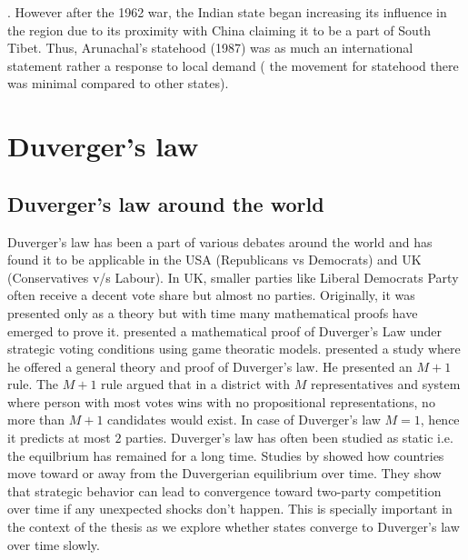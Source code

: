 \citep{verrier_elvin_2008}. However after the 1962 war, the Indian state began increasing its influence in the region due to its proximity with China claiming it to be a part of South Tibet. Thus, Arunachal’s statehood (1987) was as much an international statement rather a response to local demand ( the movement for statehood there was minimal compared to other states).

\section{Duverger's law}
\subsection{Duverger's law around the world}
Duverger's law has been a part of various debates around the world and has found it to be applicable in the USA (Republicans vs Democrats) and UK (Conservatives v/s Labour). In UK, smaller parties like Liberal Democrats Party often receive a decent vote share but almost no parties. Originally, it was presented only as a theory but with time many mathematical proofs have emerged to prove it. \cite{palfrey1989mathematical} presented a mathematical proof of Duverger’s Law under strategic voting conditions using game theoratic models. \cite{cox1997making} presented a study where he offered a general theory and proof of Duverger's law. He presented an $M+1$ rule. The $M+1$ rule argued that in a district with $M$ representatives and system where person with most votes wins with no propositional representations, no more than $M+1$ candidates would exist. In case of Duverger's law $M=1$, hence it predicts at most $2$ parties. Duverger's law has often been studied as static i.e. the equilbrium has remained for a long time. Studies by \cite{forand2015dynamic} showed how  countries move toward or away from the Duvergerian equilibrium over time.  They show that strategic behavior can lead to convergence toward two-party competition over time if any unexpected shocks don't happen. This is specially important in the context of the thesis as we explore whether states converge to Duverger's law over time slowly. 

\vspace{0.3cm}

